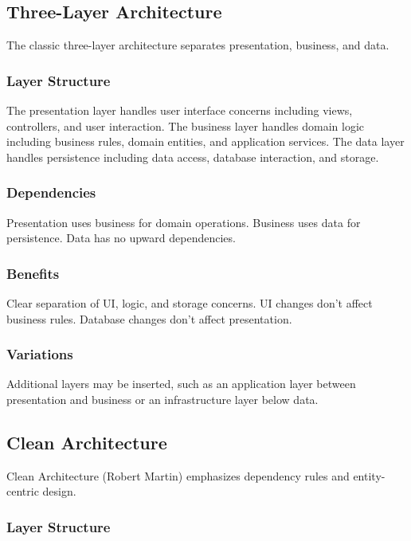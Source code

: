 \documentclass[11pt]{article}
\begin{document}
\subsection{Three-Layer Architecture}

The classic three-layer architecture separates presentation, business, and data.

\subsubsection{Layer Structure}

The presentation layer handles user interface concerns including views, controllers, and user interaction. The business layer handles domain logic including business rules, domain entities, and application services. The data layer handles persistence including data access, database interaction, and storage.

\subsubsection{Dependencies}

Presentation uses business for domain operations. Business uses data for persistence. Data has no upward dependencies.

\subsubsection{Benefits}

Clear separation of UI, logic, and storage concerns. UI changes don't affect business rules. Database changes don't affect presentation.

\subsubsection{Variations}

Additional layers may be inserted, such as an application layer between presentation and business or an infrastructure layer below data.

\subsection{Clean Architecture}

Clean Architecture (Robert Martin) emphasizes dependency rules and entity-centric design.

\subsubsection{Layer Structure}
\end{document}
